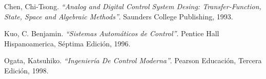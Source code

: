 \documentclass[twocolumn]{IEEEtran}
\begin{document}

\begin{thebibliography}{99}

 Chen, Chi-Tsong.
{\em "`Analog and Digital Control System Desing: Transfer-Function, State, Space and Algebraic Methods"'}.
Saunders College Publishing, 1993.

 Kuo, C. Benjamin.
{\em "`Sistemas Automáticos de Control"'}.
Pentice Hall Hispanoamerica, Séptima Edición, 1996.

 Ogata, Katsuhiko.
{\em "`Ingeniería De Control Moderna"'}.
Pearson Educación, Tercera Edición, 1998.

\end{thebibliography}
\end{document}
